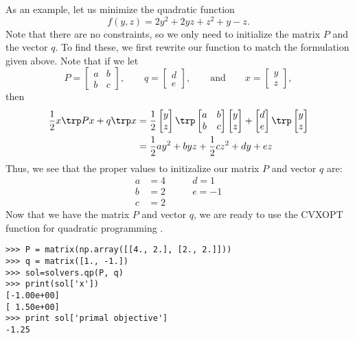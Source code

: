 As an example, let us minimize the quadratic function
\[
f(y,z) = 2y^2 +2yz + z^2 +y -z.
\]
Note that there are no constraints, so we only need to initialize the matrix $P$ and the vector $q$.
To find these, we first rewrite our function to match the formulation given above. 
Note that if we let
\[
P = \begin{bmatrix}
  a & b\\
  b & c
\end{bmatrix}, \qquad 
q = \begin{bmatrix}
  d\\
  e
\end{bmatrix},
\qquad \text{and} \qquad
x = \begin{bmatrix}
  y\\
  z
\end{bmatrix},
\]
then 
\begin{align*}
\frac{1}{2}x\trp Px + q\trp x &= 
\frac{1}{2}
\begin{bmatrix}
  y\\
  z
\end{bmatrix}\trp 
\begin{bmatrix}
  a & b\\
  b & c
\end{bmatrix}
\begin{bmatrix}
  y\\
  z
\end{bmatrix} + 
\begin{bmatrix}
  d\\
  e
\end{bmatrix}\trp 
\begin{bmatrix}
  y\\
  z
\end{bmatrix} \\
&= \frac{1}{2}ay^2+byz+\frac{1}{2}cz^2+dy+ez
\end{align*}
Thus, we see that the proper values to initizalize our matrix $P$ and vector $q$ are:
\begin{align*}
a &= 4 \qquad &d = 1 \\
b &= 2 \qquad &e = -1 \\
c &= 2 
\end{align*}
Now that we have the matrix $P$ and vector $q$, we are ready to use the CVXOPT function for quadratic programming .
\begin{lstlisting}
>>> P = matrix(np.array([[4., 2.], [2., 2.]]))
>>> q = matrix([1., -1.])
>>> sol=solvers.qp(P, q)
>>> print(sol['x'])
[-1.00e+00]
[ 1.50e+00]
>>> print sol['primal objective']
-1.25
\end{lstlisting}

